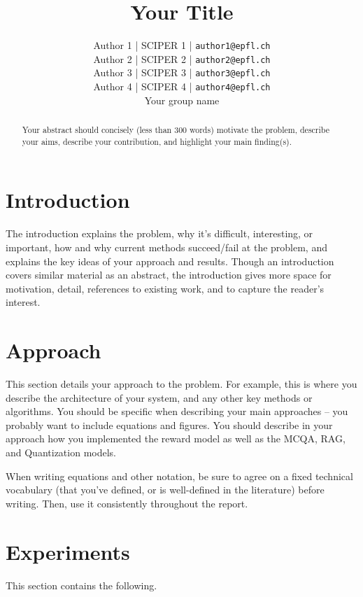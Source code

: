 \documentclass[11pt]{article}
\title{Your Title}
\author{\normalfont 
Author 1 | SCIPER 1 | \texttt{author1@epfl.ch} \\
Author 2 | SCIPER 2 | \texttt{author2@epfl.ch} \\
Author 3 | SCIPER 3 | \texttt{author3@epfl.ch} \\
Author 4 | SCIPER 4 | \texttt{author4@epfl.ch} \\
Your group name
}
\begin{document}
\maketitle
\begin{abstract}
Your abstract should concisely (less than 300 words) motivate the problem, describe your aims, describe your contribution, and highlight your main finding(s).
\end{abstract}

\section{Introduction}
The introduction explains the problem, why it’s difficult, interesting, or important, how and why current methods succeed/fail at the problem, and explains the key ideas of your approach and results. Though an introduction covers similar material as an abstract, the introduction gives more space for motivation, detail, references to existing work, and to capture the reader’s interest.


\section{Approach}
This section details your approach to the problem. For example, this is where you describe the architecture of your system, and any other key methods or algorithms. You should be specific when describing your main approaches – you probably want to include equations and figures. You should describe in your approach how you implemented the reward model as well as the MCQA, RAG, and Quantization models.

When writing equations and other notation, be sure to agree on a fixed technical vocabulary (that you’ve defined, or is well-defined in the literature) before writing. Then, use it consistently throughout the report.


\section{Experiments}
This section contains the following.
\end{document}

